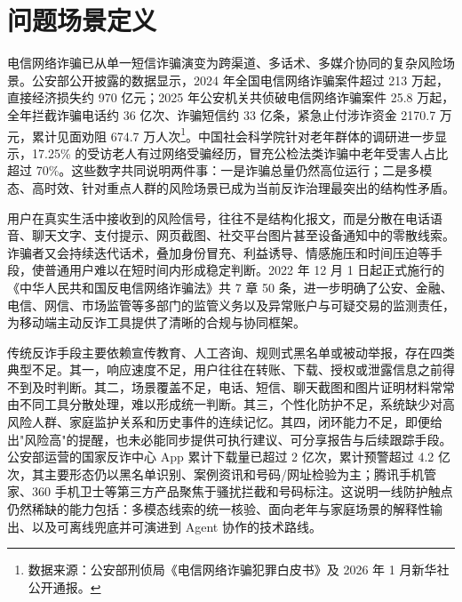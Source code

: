 \documentclass[UTF8,a4paper,12pt]{ctexart}
\begin{document}
\tableofcontents
\newpage

\listoffigures
{}
\newpage

\listoftables
{}
\newpage


\section{问题场景定义}

电信网络诈骗已从单一短信诈骗演变为跨渠道、多话术、多媒介协同的复杂风险场景。公安部公开披露的数据显示，2024 年全国电信网络诈骗案件超过 213 万起，直接经济损失约 970 亿元；2025 年公安机关共侦破电信网络诈骗案件 25.8 万起，全年拦截诈骗电话约 36 亿次、诈骗短信约 33 亿条，紧急止付涉诈资金 2170.7 万元，累计见面劝阻 674.7 万人次\footnote{数据来源：公安部刑侦局《电信网络诈骗犯罪白皮书》及 2026 年 1 月新华社公开通报。}。中国社会科学院针对老年群体的调研进一步显示，17.25\% 的受访老人有过网络受骗经历，冒充公检法类诈骗中老年受害人占比超过 70\%。这些数字共同说明两件事：一是诈骗总量仍然高位运行；二是多模态、高时效、针对重点人群的风险场景已成为当前反诈治理最突出的结构性矛盾。

用户在真实生活中接收到的风险信号，往往不是结构化报文，而是分散在电话语音、聊天文字、支付提示、网页截图、社交平台图片甚至设备通知中的零散线索。诈骗者又会持续迭代话术，叠加身份冒充、利益诱导、情感施压和时间压迫等手段，使普通用户难以在短时间内形成稳定判断。2022 年 12 月 1 日起正式施行的《中华人民共和国反电信网络诈骗法》共 7 章 50 条，进一步明确了公安、金融、电信、网信、市场监管等多部门的监管义务以及异常账户与可疑交易的监测责任，为移动端主动反诈工具提供了清晰的合规与协同框架。

传统反诈手段主要依赖宣传教育、人工咨询、规则式黑名单或被动举报，存在四类典型不足。其一，响应速度不足，用户往往在转账、下载、授权或泄露信息之前得不到及时判断。其二，场景覆盖不足，电话、短信、聊天截图和图片证明材料常常由不同工具分散处理，难以形成统一判断。其三，个性化防护不足，系统缺少对高风险人群、家庭监护关系和历史事件的连续记忆。其四，闭环能力不足，即便给出"风险高"的提醒，也未必能同步提供可执行建议、可分享报告与后续跟踪手段。公安部运营的国家反诈中心 App 累计下载量已超过 2 亿次，累计预警超过 4.2 亿次，其主要形态仍以黑名单识别、案例资讯和号码/网址检验为主；腾讯手机管家、360 手机卫士等第三方产品聚焦于骚扰拦截和号码标注。这说明一线防护触点仍然稀缺的能力包括：多模态线索的统一核验、面向老年与家庭场景的解释性输出、以及可离线兜底并可演进到 Agent 协作的技术路线。
\end{document}
